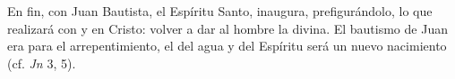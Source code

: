  En fin, con Juan Bautista, el Espíritu Santo, inaugura, prefigurándolo, lo que realizará con y en Cristo: volver a dar al hombre la  divina. El bautismo de Juan era para el arrepentimiento, el del agua y del Espíritu será un nuevo nacimiento (cf. \emph{Jn} 3, 5).